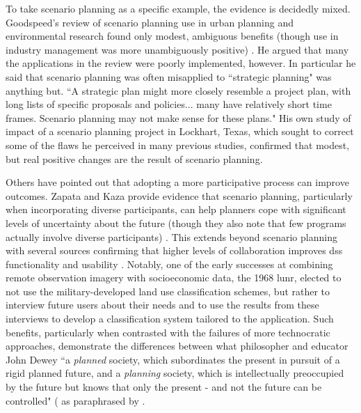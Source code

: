 To take scenario planning as a specific example, the evidence is decidedly mixed. Goodspeed's review of scenario planning use in urban planning and environmental research found only modest, ambiguous benefits (though use in industry management was more unambiguously positive) \cite{goodspeedScenarioPlanningCities2020}. He argued that many the applications in the review were poorly implemented, however. In particular he said that scenario planning was often misapplied to ``strategic planning" was anything but. ``A strategic plan might more closely resemble a project plan, with long lists of specific proposals and policies... many have relatively short time frames. Scenario planning may not make sense for these plans." His own study of impact of a scenario planning project in Lockhart, Texas, which sought to correct some of the flaws he perceived in many previous studies, confirmed that modest, but real positive changes are the result of scenario planning.

Others have pointed out that adopting a more participative process can improve outcomes. Zapata and Kaza provide evidence that scenario planning, particularly when incorporating diverse participants, can help planners cope with significant levels of uncertainty about the future (though they also note that few programs actually involve diverse participants) \cite{zapataRadicalUncertaintyScenario2015}. This extends beyond scenario planning with several sources confirming that higher levels of collaboration improves \ac{dss} functionality and usability \cite{goodspeedDeathLifeCollaborative2016, vonkSociotechnicalPSSDevelopment2010, brommelstroetPlanningSupportSystems2010, ulibarriCollaborativeModelDevelopment2018}. Notably, one of the early successes at combining remote observation imagery with socioeconomic data, the 1968 \ac{lunr}, elected to not use the military-developed land use classification schemes, but rather to interview future users about their needs and to use the results from these interviews to develop a classification system tailored to the application. Such benefits, particularly when contrasted with the failures of more technocratic approaches, demonstrate the differences between what philosopher and educator John Dewey ``a \textit{planned} society, which subordinates the present in pursuit of a rigid planned future, and a \textit{planning} society, which is intellectually preoccupied by the future but knows that only the present - and not the future can be controlled" (\cite{deweyHumanNatureConduct2007} as paraphrased by \cite{goodspeedScenarioPlanningCities2020}.

